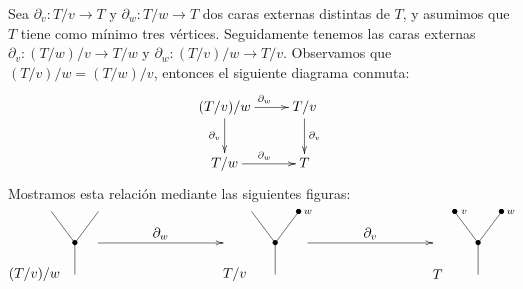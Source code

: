 \documentclass[11pt,a4paper,openright,oneside]{article}
\numberwithin{equation}{section}
\theoremstyle{definition}
\begin{document}
Sea $\partial_v \colon T/v\to T$ y $\partial_w \colon T/w\to T$ dos caras externas distintas de $T$, y asumimos que $T$ tiene como m\'inimo tres v\'ertices.
Seguidamente tenemos las caras externas $\partial_v \colon (T/w)/v \to T/w$ y $\partial_w \colon (T/v)/w \to T/v$. Observamos que $(T/v)/w = (T/w)/v$, entonces el siguiente diagrama conmuta:
$$
    \xymatrix{
        (T/v)/w \ar[d]_{\partial_v} \ar[r]^{\partial_w}
        &T/v \ar[d]^{\partial_v} \\
        T/w \ar[r]^{\partial_w}
        &T
    }
$$
Mostramos esta relaci\'on mediante las siguientes figuras:
\begin{equation}
    \xy
    <0.08cm, 0cm>:
    (0.0, 0.0)*{}="1"; %
    (0.0, 10.0)*=0{\bullet}="2"; %
    (-7.5, 20.0)*{}="3"; %
    (7.5, 20.0)*{}="4"; %
    "1";"2" **\dir{-};
    "2";"3" **\dir{-};
    "2";"4" **\dir{-};
    (-13,0)*{(T/v)/w};
    \endxy
    \xy
    <0.08cm, 0cm>:
    (-20, 0.0)*{}="1";
    (20, 0.0)*{}="2";
    (20, 10)*{}="3";
    (-20, 0)*{}="4";
    {\ar(-20, 10)*{};(20,10)*{}};
    (0,13)*{\partial_w};
    \endxy
    \xy
    <0.08cm, 0cm>:
    (0.0, 0.0)*{}="1"; %
    (0.0, 10.0)*=0{\bullet}="2"; %
    (-7.5, 20.0)*{}="3"; %
    (7.5, 20.0)*=0{\bullet}="4"; %
    "1";"2" **\dir{-};
    "2";"3" **\dir{-};
    "2";"4" **\dir{-};
    (10.5, 20.0)*=0{\scriptstyle w};
    (-13,0)*{T/v};
    \endxy
    \xy
    <0.08cm, 0cm>:
    (-20, 0.0)*{}="1";
    (20, 0.0)*{}="2";
    (20, 10)*{}="3";
    (-20, 0)*{}="4";
    {\ar(-20, 10)*{};(20,10)*{}};
    (0,13)*{\partial_v};
    \endxy
    \xy
    <0.08cm, 0cm>:
    (0.0, 0.0)*{}="1"; %
    (0.0, 10.0)*=0{\bullet}="2"; %
    (-7.5, 20.0)*=0{\bullet}="3"; %
    (7.5, 20.0)*=0{\bullet}="4"; %
    "1";"2" **\dir{-};
    "2";"3" **\dir{-};
    "2";"4" **\dir{-};
    (-4.5, 20.0)*=0{\scriptstyle v};
    (10.5, 20.0)*=0{\scriptstyle w};
    (-13,0)*{T};
    \endxy
\end{equation}
\end{document}
